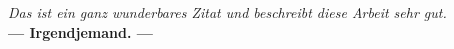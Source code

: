 \pagestyle{empty}
\vspace*{\fill}
\begin{center}
	\huge{
	\glqq
	\textit{Das ist ein ganz wunderbares Zitat und beschreibt diese Arbeit sehr gut.}\grqq\\
	\textbf{--- Irgendjemand. ---}
	}
\end{center}

\vfill